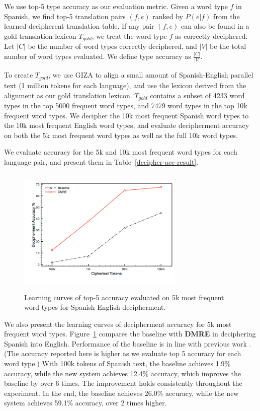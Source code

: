 We use top-5 type accuracy as our evaluation metric.  Given a word type $f$ in Spanish, we find top-5 translation pairs $(f,e)$ ranked by $P(e|f)$ from the learned decipherent translation table. If any pair $(f,e)$ can also be found in a gold translation lexicon $T_{gold}$, we treat the word type $f$ as correctly deciphered. Let $|C|$ be the number of word types correctly deciphered, and $|V|$ be the total number of word types evaluated. We define type accuracy as $\frac{|C|}{|V|}$.

To create $T_{gold}$, we use GIZA to align a small amount of Spanish-English parallel text (1 million tokens for each language), and use the lexicon derived from the alignment as our gold translation lexicon. $T_{gold}$ contains a subset of 4233 word types in the top 5000 frequent word types, and 7479 word types in the top 10k frequent word types. We decipher the 10k most frequent Spanish word types to the 10k most frequent English word types, and evaluate decipherment accuracy on both the 5k most frequent word types as well as the full 10k word types.

 We evaluate accuracy for the 5k and 10k most frequent word types for each language pair, and present them in Table~\ref{decipher-acc-result}.


 \begin{figure}[!ht]
  \centering
  \includegraphics[width=3.1in,height=2.4in]{es_en_curve}
  \caption{Learning curves of top-5 accuracy evaluated on 5k most frequent word types for Spanish-English decipherment.}
\label{es-en-curve}
\end{figure}

We also present the learning curves of decipherment accuracy for 5k most frequent word types. Figure~\ref{es-en-curve} compares the baseline with \textbf{DMRE} in deciphering Spanish into English. Performance of the baseline is in line with previous work \cite{dou-knight:2013:EMNLP}. (The accuracy reported here is higher as we evaluate top 5 accuracy for each word type.) With 100k tokens of Spanish text, the baseline achieves 1.9\% accuracy, while the new system achieves 12.4\% accuracy, which improves the baseline by over 6 times. The improvement holds consistently throughout the experiment. In the end, the baseline achieves 26.0\% accuracy, while the new system achieves 59.1\% accuracy, over 2 times higher. 

